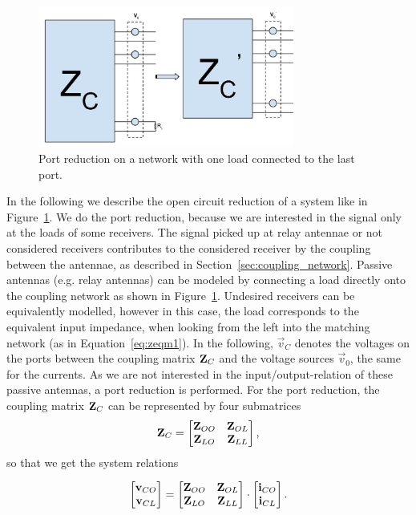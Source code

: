 \begin{figure}
\begin{center}
\includegraphics[width=0.75\textwidth]{images/Port_reduction.jpg}
\caption{Port reduction on a network with one load connected to the last port.}
\label{fig:port_reduction}
\end{center}
\end{figure}
In the following we describe the open circuit reduction of a system like in Figure~\ref{fig:port_reduction}.
We do the port reduction, because we are interested in the signal only at the loads of some receivers.
The signal picked up at relay antennae or not considered receivers contributes to the considered receiver by the coupling between the antennae, as described in Section~\ref{sec:coupling_network}.
Passive antennas (e.g. relay antennas) can be modeled by connecting a load directly onto the coupling network as shown in Figure~\ref{fig:port_reduction}.
Undesired receivers can be equivalently modelled, however in this case, the load corresponds to the equivalent input impedance, when looking from the left into the matching network (as in Equation~\eqref{eq:zeqm1}).
In the following, $\vec{v}_C$ denotes the voltages on the ports between the coupling matrix $\mathbf{Z}_C$ and the voltage sources $\vec{v}_0$, the same for the currents.
As we are not interested in the input/output-relation of these passive antennas, a port reduction is performed.
For the port reduction, the coupling matrix $\mathbf{Z}_C$ can be represented by four submatrices
\begin{equation}
\mathbf{Z}_C=
\begin{bmatrix}
\mathbf{Z}_{OO} & \mathbf{Z}_{OL}\\
\mathbf{Z}_{LO} & \mathbf{Z}_{LL}
\end{bmatrix},
\end{equation}
so that we get the system relations

\begin{align}
\label{eq:ocl_matrix}
\begin{bmatrix}
\mathbf{v}_{CO} \\
\mathbf{v}_{CL}
\end{bmatrix}
=
\begin{bmatrix}
\mathbf{Z}_{OO} & \mathbf{Z}_{OL}\\
\mathbf{Z}_{LO} & \mathbf{Z}_{LL}
\end{bmatrix}\cdot
\begin{bmatrix}
\mathbf{i}_{CO} \\
\mathbf{i}_{CL}
\end{bmatrix}.
\end{align}

